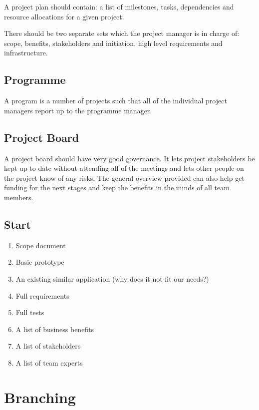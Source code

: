 A project plan should contain: a list of milestones, tasks, dependencies and resource allocations for a given project.

There should be two separate sets which the project manager is in charge of: scope, benefits, stakeholders and initiation, high level requirements and infrastructure.

\subsection{Programme}\label{sub:programme}

A program is a number of projects such that all of the individual project managers report up to the programme manager.

\subsection{Project Board}\label{sub:project_board}

A project board should have very good governance.
It lets project stakeholders be kept up to date without attending all of the meetings and lets other people on the project know of any risks.
The general overview provided can also help get funding for the next stages and keep the benefits in the minds of all team members.

\subsection{Start}\label{sub:start}

\begin{enumerate}
    \item Scope document
    \item Basic prototype
    \item An existing similar application (why does it not fit our needs?)
    \item Full requirements
    \item Full tests
    \item A list of business benefits
    \item A list of stakeholders
    \item A list of team experts
\end{enumerate}

\section{Branching}\label{sec:branching}

